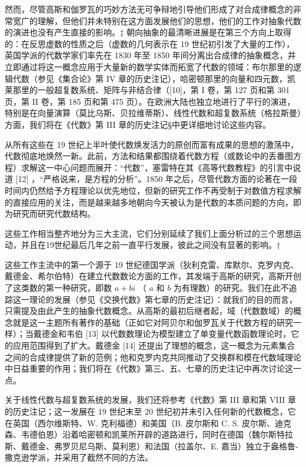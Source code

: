 然而，尽管高斯和伽罗瓦的巧妙方法无可争辩地引导他们形成了对合成律概念的非常宽广的理解，但他们并未特别在这方面发展他们的思想，他们的工作对抽象代数的演进也没有产生直接的影响。‡ 朝向抽象的最清晰进展是在第三个方向上取得的：在反思虚数的性质之后（虚数的几何表示在 19 世纪初引发了大量的工作），英国学派的代数学家们率先在 1830 年至 1850 年间分离出合成律的抽象概念，并立即通过将这一概念应用于大量新的数学实体而拓宽了代数的领域：布尔那里的逻辑代数（参见《集合论》第 IV 章的历史注记），哈密顿那里的向量和四元数，凯莱那里的一般超复数系统、矩阵与非结合律（{[}10{]}，第 I 卷，第 127 页和第 301 页，第 II 卷，第 185 页和第 475 页）。在欧洲大陆也独立地进行了平行的演进，特别是在向量演算（莫比乌斯、贝拉维蒂斯）、线性代数和超复数系统（格拉斯曼）方面，我们将在《代数》第 III 章的历史注记§中更详细地讨论这些内容。

从所有这些在 19 世纪上半叶使代数焕发活力的原创而富有成果的思想的激荡中，代数彻底地焕然一新。此前，方法和结果都围绕着代数方程（或数论中的丢番图方程）求解这一中心问题而展开：“代数”，塞雷特在其《高等代数教程》的引言中说道 {[}12{]} ，“严格说来，是方程的分析”。1850 年之后，尽管代数方面的论著在一段时间内仍然给予方程理论以优先地位，但新的研究工作不再受制于对数值方程求解的直接应用的关注，而是越来越多地朝向今天被认为是代数的本质问题的方向，即为研究而研究代数结构。

这些工作相当整齐地分为三大主流，它们分别延续了我们上面分析过的三个思想运动，并且在19世纪最后几年之前一直平行发展，彼此之间没有显著的影响。†

这些工作主流中的第一个源于 19 世纪德国学派（狄利克雷、库默尔、克罗内克、戴德金、希尔伯特）在建立代数数论方面的工作，其发端于高斯的研究，高斯开创了这类数的第一种研究，即数 \(a + bi\) （ \(a\) 和 \(b\) 为有理数）的研究。我们在此不追踪这一理论的发展（参见《交换代数》第七章的历史注记）：就我们的目的而言，只需提及由此产生的抽象代数概念。从高斯的最初后继者起，域（代数数域）的概念就是这一主题所有著作的基础（正如它对阿贝尔和伽罗瓦关于代数方程的研究一样）；当戴德金和韦伯 {[}13{]} 以代数数理论为模型建立了单变量代数函数理论时，它的应用范围得到了扩大。戴德金 {[}14{]} 还提出了理想的概念，这一概念为元素集合之间的合成律提供了新的范例；他和克罗内克共同推动了交换群和模在代数域理论中日益重要的作用；我们将在《代数》第三、五、七章的历史注记中再次讨论这一点。

关于线性代数与超复数系统的发展，我们还将参考《代数》第 III 章和第 VIII 章的历史注记；这一发展在 19 世纪末至 20 世纪初并未引入任何新的代数概念，它在英国（西尔维斯特、W. 克利福德）和美国（B. 皮尔斯和 C. S. 皮尔斯、迪克森、韦德伯恩）沿着哈密顿和凯莱所开辟的道路进行，同时在德国（魏尔斯特拉斯、戴德金、弗罗贝尼乌斯、莫利恩）和法国（拉盖尔、E. 嘉当）独立于盎格鲁-撒克逊学派，并采用了截然不同的方法。

